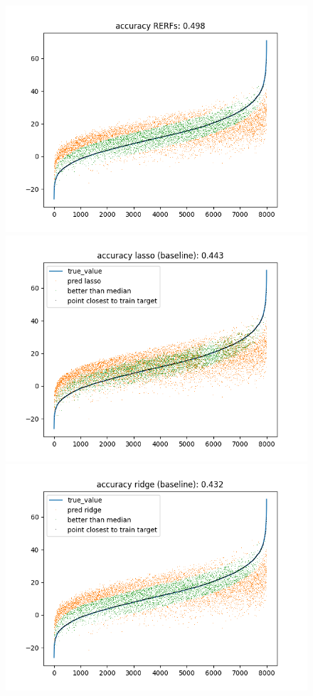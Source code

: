 \documentclass{article}
\begin{document}
\newpage
\begin{figure}
\includegraphics[scale=0.5]{pred_RERFsvs_true.png}
\includegraphics[scale=0.5]{pred_lasso_vs_true.png}
\includegraphics[scale=0.5]{pred_ridge_vs_true.png}
\end{figure}

\
\end{document}
